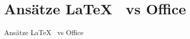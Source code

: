 \section{Ansätze \LaTeX \mbox{ } vs Office}

\begin{frame}{Ansätze \LaTeX \mbox{ } vs Office}
	\begin{columns}
		
	\end{columns}
\end{frame}